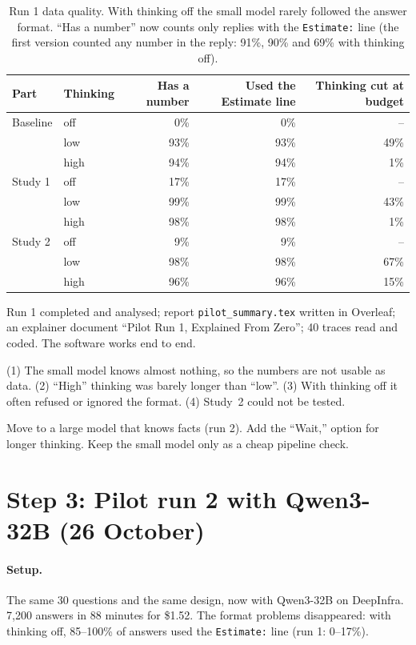 \documentclass[11pt,a4paper]{article}
\newcommand{\dpn}[3]{%
\begin{tcolorbox}[breakable, colback=white, colframe=trline, boxrule=0.4pt, arc=0pt, left=6pt, right=6pt, top=4pt, bottom=4pt, before skip=10pt, after skip=10pt]
\small
\noindent{\color{donecol}\textsf{\textbf{DONE}}}\quad #1\par\medskip
\noindent{\color{probcol}\textsf{\textbf{PROBLEM}}}\quad #2\par\medskip
\noindent{\color{nextcol}\textsf{\textbf{WHAT WE DID / DO NEXT}}}\quad #3
\end{tcolorbox}}
\begin{document}
\begin{table}[ht]
\centering\small
\begin{tabular}{@{}llrrr@{}}
\toprule
\textbf{Part} & \textbf{Thinking} & \textbf{Has a number} & \textbf{Used the Estimate line} & \textbf{Thinking cut at budget} \\
\midrule
Baseline & off & 0\% & 0\% & -- \\
 & low & 93\% & 93\% & 49\% \\
 & high & 94\% & 94\% & 1\% \\
Study 1 & off & 17\% & 17\% & -- \\
 & low & 99\% & 99\% & 43\% \\
 & high & 98\% & 98\% & 1\% \\
Study 2 & off & 9\% & 9\% & -- \\
 & low & 98\% & 98\% & 67\% \\
 & high & 96\% & 96\% & 15\% \\
\bottomrule
\end{tabular}
\caption{Run 1 data quality. With thinking off the small model rarely followed the answer format. ``Has a number'' now counts only replies with the \texttt{Estimate:} line (the first version counted any number in the reply: 91\%, 90\% and 69\% with thinking off).}
\end{table}

\dpn{Run 1 completed and analysed; report \texttt{pilot\_summary.tex} written in Overleaf; an explainer document ``Pilot Run 1, Explained From Zero''; 40 traces read and coded. The software works end to end.}
{(1) The small model knows almost nothing, so the numbers are not usable as data. (2) ``High'' thinking was barely longer than ``low''. (3) With thinking off it often refused or ignored the format. (4) Study~2 could not be tested.}
{Move to a large model that knows facts (run 2). Add the ``Wait,'' option for longer thinking. Keep the small model only as a cheap pipeline check.}

\section{Step 3: Pilot run 2 with Qwen3-32B (26 October)}
\label{sec:run2}

\paragraph{Setup.} The same 30 questions and the same design, now with Qwen3-32B on DeepInfra. 7,200 answers in 88 minutes for \$1.52. The format problems disappeared: with thinking off, 85--100\% of answers used the \texttt{Estimate:} line (run 1: 0--17\%).
\end{document}
